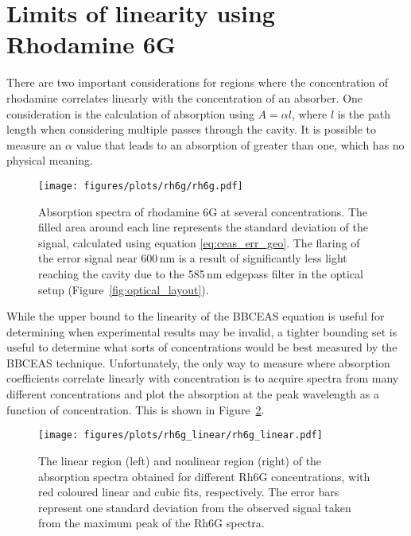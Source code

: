 \section{Limits of linearity using Rhodamine 6G}\label{sec:rhodamine}

There are two important considerations for regions where the concentration
of rhodamine correlates linearly with the concentration of an absorber. One
consideration is the calculation of absorption using $A = \alpha l$, where $l$
is the path length when considering multiple passes through the cavity. It is
possible to measure an $\alpha$ value that leads to an absorption of greater
than one, which has no physical meaning.

\begin{figure}
\begin{center}
  \texttt{[image: figures/plots/rh6g/rh6g.pdf]}
\end{center}
\caption[Rhodamine 6G Absorption Spectra as a Calibration]{Absorption spectra of rhodamine 6G at several concentrations. The filled area around each line represents the standard deviation of the signal, calculated using equation \eqref{eq:ceas_err_geo}. The flaring of the error signal near 600\,nm is a result of significantly less light reaching the cavity due to the 585\,nm edgepass filter in the optical setup (Figure~\ref{fig:optical_layout}).}
\label{fig:rh6g}
\end{figure}


While the upper bound to the linearity of the \ac{BBCEAS} equation is useful
for determining when experimental results may be invalid, a tighter bounding
set is useful to determine what sorts of concentrations would be best
measured by the \ac{BBCEAS} technique. Unfortunately, the only way to measure
where absorption coefficients correlate linearly with concentration is to
acquire spectra from many different concentrations and plot the absorption
at the peak wavelength as a function of concentration. This is shown in
Figure~\ref{fig:rh6g_lin}.

\begin{figure}[th]
\begin{center}
  \texttt{[image: figures/plots/rh6g\_linear/rh6g\_linear.pdf]}
\end{center}
\caption[Dynamic Range of Rhodamine 6G Measurements with \ac{BBCEAS}]{The linear region (left) and nonlinear region (right) of the absorption spectra obtained for different Rh6G concentrations, with red coloured linear and cubic fits, respectively. The error bars represent one standard deviation from the observed signal taken from the maximum peak of the Rh6G spectra.}
\label{fig:rh6g_lin}
\end{figure}

